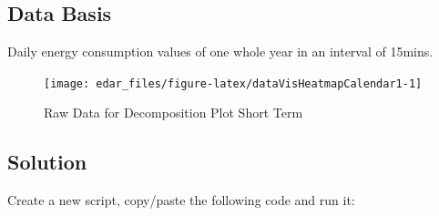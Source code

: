 \documentclass[
  a4paperpaper,
]{book}
\begin{document}
\hypertarget{data-basis-10}{%
\subsection{Data Basis}\label{data-basis-10}}

Daily energy consumption values of one whole year in an interval of 15mins.

\begin{figure}
\texttt{[image: edar\_files/figure-latex/dataVisHeatmapCalendar1-1]} \caption{Raw Data for Decomposition Plot Short Term}\label{fig:dataVisHeatmapCalendar1}
\end{figure}

\newpage

\hypertarget{solution-10}{%
\subsection{Solution}\label{solution-10}}

Create a new script, copy/paste the following code and run it:
\end{document}

